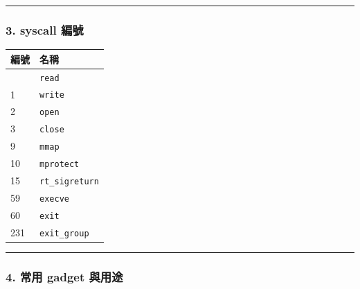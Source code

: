 \documentclass[10pt,a4paper]{article}
\newcounter{none}
\begin{document}
\begin{center}\rule{0.5\linewidth}{0.5pt}\end{center}

\subsubsection{3. syscall 編號}\label{syscall-ux7de8ux865f}

{\def\LTcaptype{none} %
\begin{longtable}[]{@{}ll@{}}
\toprule\noalign{}
編號 & 名稱 \\
\midrule\noalign{}
\endhead
\bottomrule\noalign{}
\endlastfoot
0 & \texttt{read} \\
1 & \texttt{write} \\
2 & \texttt{open} \\
3 & \texttt{close} \\
9 & \texttt{mmap} \\
10 & \texttt{mprotect} \\
15 & \texttt{rt\_\allowbreak{}sigreturn} \\
59 & \texttt{execve} \\
60 & \texttt{exit} \\
231 & \texttt{exit\_\allowbreak{}group} \\
\end{longtable}
}

\begin{center}\rule{0.5\linewidth}{0.5pt}\end{center}

\subsubsection{4. 常用 gadget
與用途}\label{ux5e38ux7528-gadget-ux8207ux7528ux9014}
\end{document}
